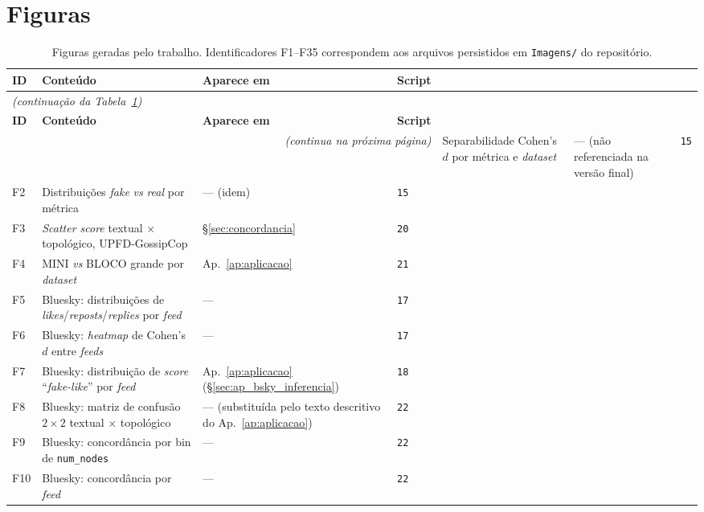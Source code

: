 \section{Figuras}
\label{sec:ap_figuras}

\footnotesize
\begin{longtable}{p{1cm}p{6.5cm}p{2.6cm}p{2.2cm}}
\caption{Figuras geradas pelo trabalho. Identificadores F1--F35
correspondem aos arquivos persistidos em \texttt{Imagens/} do
reposit\'orio.}\label{tab:indice_figuras}\\
\hline
\textbf{ID} & \textbf{Conte\'udo} & \textbf{Aparece em} & \textbf{Script} \\
\hline
\endfirsthead
\multicolumn{4}{l}{\footnotesize \emph{(continuação da Tabela~\ref{tab:indice_figuras})}}\\[2pt]
\hline
\textbf{ID} & \textbf{Conte\'udo} & \textbf{Aparece em} & \textbf{Script} \\
\hline
\endhead
\hline
\multicolumn{4}{r}{\footnotesize \emph{(continua na pr\'oxima p\'agina)}}
\endfoot
\hline
\endlastfoot
F1  & Separabilidade Cohen's $d$ por m\'etrica e \emph{dataset} & --- (n\~ao referenciada na vers\~ao final) & \texttt{15} \\
F2  & Distribui\c{c}\~oes \emph{fake} \emph{vs} \emph{real} por m\'etrica & --- (idem) & \texttt{15} \\
F3  & \emph{Scatter score} textual $\times$ topol\'ogico, UPFD-GossipCop & §\ref{sec:concordancia} & \texttt{20} \\
F4  & MINI \emph{vs} BLOCO grande por \emph{dataset} & Ap.~\ref{ap:aplicacao} & \texttt{21} \\
F5  & Bluesky: distribui\c{c}\~oes de \emph{likes}/\emph{reposts}/\emph{replies} por \emph{feed} & --- & \texttt{17} \\
F6  & Bluesky: \emph{heatmap} de Cohen's $d$ entre \emph{feeds} & --- & \texttt{17} \\
F7  & Bluesky: distribui\c{c}\~ao de \emph{score} ``\emph{fake-like}'' por \emph{feed} & Ap.~\ref{ap:aplicacao} (§\ref{sec:ap_bsky_inferencia}) & \texttt{18} \\
F8  & Bluesky: matriz de confus\~ao $2 \times 2$ textual $\times$ topol\'ogico & --- (substitu\'ida pelo texto descritivo do Ap.~\ref{ap:aplicacao}) & \texttt{22} \\
F9  & Bluesky: concord\^ancia por bin de \texttt{num\_nodes} & --- & \texttt{22} \\
F10 & Bluesky: concord\^ancia por \emph{feed} & --- & \texttt{22} \\

\end{longtable}
